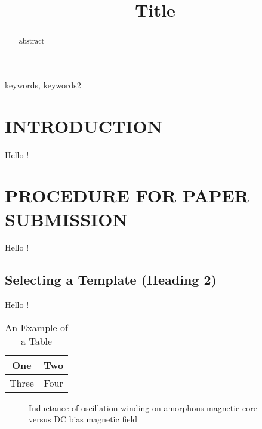 \documentclass[conference]{IEEEtran}
\begin{document}
\DeclareRobustCommand*{\IEEEauthorrefmark}[1]{%
    \raisebox{0pt}[0pt][0pt]{\textsuperscript{\footnotesize\ensuremath{#1}}}}

\title{Title}
\author{
}


\maketitle

\begin{abstract}
abstract
\end{abstract}

\begin{IEEEkeywords}
keywords, keywords2
\end{IEEEkeywords}

\section{INTRODUCTION}
Hello !

\section{PROCEDURE FOR PAPER SUBMISSION}
Hello !
\subsection{Selecting a Template (Heading 2)}

Hello !

\begin{table}[h]
\caption{An Example of a Table}
\label{table_example}
\begin{center}
\begin{tabular}{|c||c|}
\hline
One & Two\\
\hline
Three & Four\\
\hline
\end{tabular}
\end{center}
\end{table}


\begin{figure}[thpb]
  \centering
  \caption{Inductance of oscillation winding on amorphous
   magnetic core versus DC bias magnetic field}
  \label{figurelabel}
\end{figure}
   
\end{document}
